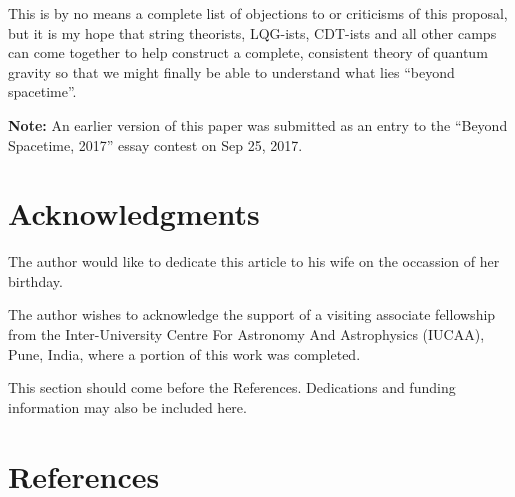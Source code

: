 \documentclass{ws-mpla}
\begin{document}
This is by no means a complete list of objections to or criticisms of this proposal, but it is my hope that string theorists, LQG-ists, CDT-ists and all other camps can come together to help construct a complete, consistent theory of quantum gravity so that we might finally be able to understand what lies ``beyond spacetime''.

\textbf{Note:} An earlier version of this paper was submitted as an entry to the ``Beyond Spacetime, 2017'' essay contest on Sep 25, 2017.


\section*{Acknowledgments}
The author would like to dedicate this article to his wife on the occassion of her birthday.

The author wishes to acknowledge the support of a visiting associate fellowship from the Inter-University Centre For Astronomy And Astrophysics (IUCAA), Pune, India, where a portion of this work was completed.

%

This section should come before the References. Dedications and funding
information may also be included here.

\section*{References}
\end{document}
